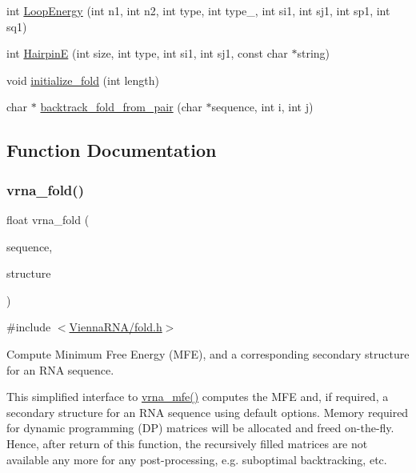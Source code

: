 \begin{DoxyCompactItemize}
\item 
int \mbox{\hyperlink{group__mfe__fold__single_ga2163034a25c6115d894b199e97e03f6c}{Loop\+Energy}} (int n1, int n2, int type, int type\+\_, int si1, int sj1, int sp1, int sq1)
\item 
int \mbox{\hyperlink{group__mfe__fold__single_gab327ce11972f5ac069d52c8dedfdb700}{HairpinE}} (int size, int type, int si1, int sj1, const char $\ast$string)
\item 
void \mbox{\hyperlink{group__mfe__fold__single_gac3f0a28d9cb609d388b155445073fd20}{initialize\+\_\+fold}} (int length)
\item 
char $\ast$ \mbox{\hyperlink{group__mfe__fold__single_ga33c35bfd60df9d7a97aec72b887e6858}{backtrack\+\_\+fold\+\_\+from\+\_\+pair}} (char $\ast$sequence, int i, int j)
\end{DoxyCompactItemize}


\subsection{Function Documentation}
\mbox{\label{group__mfe__fold__single_ga29a33b2895f4e67b0480271ff289afdc}} 
\subsubsection{\texorpdfstring{vrna\+\_\+fold()}{vrna\_fold()}}
{\footnotesize\ttfamily float vrna\+\_\+fold (\begin{DoxyParamCaption}\item[{const char $\ast$}]{sequence,  }\item[{char $\ast$}]{structure }\end{DoxyParamCaption})}



{\ttfamily \#include $<$\mbox{\hyperlink{fold_8h}{Vienna\+R\+N\+A/fold.\+h}}$>$}



Compute Minimum Free Energy (M\+FE), and a corresponding secondary structure for an R\+NA sequence. 

This simplified interface to \mbox{\hyperlink{group__mfe__fold_gabd3b147371ccf25c577f88bbbaf159fd}{vrna\+\_\+mfe()}} computes the M\+FE and, if required, a secondary structure for an R\+NA sequence using default options. Memory required for dynamic programming (DP) matrices will be allocated and free\textquotesingle{}d on-\/the-\/fly. Hence, after return of this function, the recursively filled matrices are not available any more for any post-\/processing, e.\+g. suboptimal backtracking, etc.


